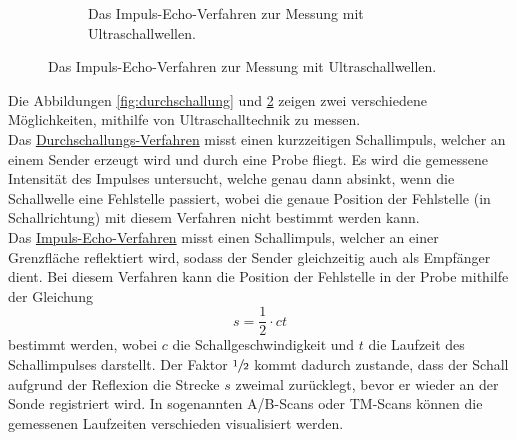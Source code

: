 \begin{figure}
\begin{subfigure}{0.48\textwidth}
            \caption{Das Impuls-Echo-Verfahren zur Messung mit Ultraschallwellen. \cite{versuchsanleitung}}
            \label{fig:impuls_echo}
        \end{subfigure}
    \end{figure}

    Die Abbildungen \ref{fig:durchschallung} und \ref{fig:impuls_echo} zeigen zwei verschiedene Möglichkeiten,
    mithilfe von Ultraschalltechnik zu messen.\\
    Das \hyperref[fig:durchschallung]{Durchschallungs-Verfahren} misst einen kurzzeitigen Schallimpuls,
    welcher an einem Sender erzeugt wird und durch eine Probe fliegt.
    Es wird die gemessene Intensität des Impulses untersucht,
    welche genau dann absinkt,
    wenn die Schallwelle eine Fehlstelle passiert,
    wobei die genaue Position der Fehlstelle (in Schallrichtung)
    mit diesem Verfahren nicht bestimmt werden kann.\\
    Das \hyperref[fig:impuls_echo]{Impuls-Echo-Verfahren} misst einen Schallimpuls,
    welcher an einer Grenzfläche reflektiert wird,
    sodass der Sender gleichzeitig auch als Empfänger dient.
    Bei diesem Verfahren kann die Position der Fehlstelle in der Probe mithilfe der Gleichung
    \begin{equation}
        s = \frac{1}{2} \cdot c t
        \label{eqn:position_fehlstelle}
    \end{equation}
    bestimmt werden,
    wobei $c$ die Schallgeschwindigkeit und $t$ die Laufzeit des Schallimpulses darstellt.
    Der Faktor $\sfrac{1}{2}$ kommt dadurch zustande,
    dass der Schall aufgrund der Reflexion die Strecke $s$ zweimal zurücklegt,
    bevor er wieder an der Sonde registriert wird.
    In sogenannten A/B-Scans oder TM-Scans können die gemessenen Laufzeiten verschieden visualisiert werden.
